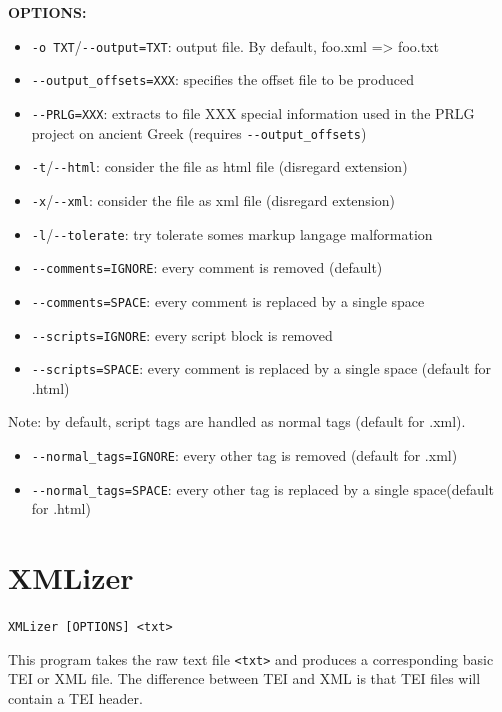 \bigskip
\noindent \textbf{OPTIONS:}
\begin{itemize}
           \item \verb+-o TXT+/\verb+--output=TXT+: output file. By default, foo.xml => foo.txt
		   \item \verb+--output_offsets=XXX+: specifies the offset file to be produced
		   \item \verb+--PRLG=XXX+: extracts to file XXX special information used in the
		               PRLG project on ancient Greek (requires \verb+--output_offsets+)
		
\bigskip 
		   \item \verb+-t+/\verb+--html+: consider the file as html file (disregard extension)
           \item \verb+-x+/\verb+--xml+: consider the file as xml file (disregard extension)
           \item \verb+-l+/\verb+--tolerate+: try tolerate somes markup langage malformation
	
\bigskip	 
		   \item \verb+--comments=IGNORE+: every comment is removed (default)
		   \item \verb+--comments=SPACE+: every comment is replaced by a single space
		   \item \verb+--scripts=IGNORE+: every script block is removed
		   \item \verb+--scripts=SPACE+: every comment is replaced by a single space (default for .html)
\end{itemize}   
  Note: by default, script tags are handled as normal tags (default for .xml).
\begin{itemize}		     
		   \item \verb+--normal_tags=IGNORE+: every other tag is removed (default for .xml)
		   \item \verb+--normal_tags=SPACE+: every other tag is replaced by a single space(default for .html)

\end{itemize}         
         


\section{XMLizer}
\label{section-XMLizer}
\verb+XMLizer [OPTIONS] <txt>+

\bigskip
\noindent This program takes the raw text file \verb+<txt>+ and produces a
corresponding basic TEI or XML file. The difference between TEI and XML is that 
TEI files will contain a TEI header.

